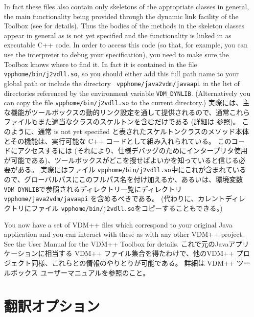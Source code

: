 \documentclass[\pformat,12pt]{jarticle}
\newcommand{\vdmhome}{vpphome}
\begin{document}
In fact these files also contain only skeletons of the appropriate
classes in general, the main functionality being provided through the
dynamic link facility of the Toolbox (see \cite{DLMan-SCSK} for
details). Thus the bodies of the methods in the skeleton classes
appear in general as \textsf{is not yet specified} and the
functionality is linked in as executable C++ code. In order to access
this code (so that, for example, you can use the interpreter to debug
your specification), you need to make sure the Toolbox knows where to
find it. In fact it is contained in the file {\tt
  \vdmhome/bin/j2vdll.so}, so you should either add this full 
path name to your global path or include the directory {\tt
  \vdmhome/java2vdm/javaapi} in the list of directories referenced by the
environment variable {\tt VDM\_DYNLIB}. (Alternatively you can copy
the file {\tt \vdmhome/bin/j2vdll.so} to the current directory.)
実際には、主な機能がツールボックスの動的リンク設定を通して提供されるので、通常これらファイルもまた適当なクラスのスケルトンを含むだけである (詳細は\cite{DLMan-SCSK} 参照)。 
このように、通常 \textsf{is not yet specified} と表されたスケルトンクラスのメソッド本体とその機能は、実行可能な C++ コードとして組み入れられている。
このコードにアクセスするには (それにより、仕様デバッグのためにインタープリタ使用が可能である)、ツールボックスがどこを捜せばよいかを知っていると信じる必要がある。 
実際にはファイル {\tt  \vdmhome/bin/j2vdll.so}中にこれが含まれているので、グローバルパスにこのフルパス名を付け加えるか、あるいは、環境変数 {\tt VDM\_DYNLIB}で参照されるディレクトリ一覧にディレクトリ {\tt  \vdmhome/java2vdm/javaapi} を含めるべきである。
(代わりに、カレントディレクトリにファイル {\tt \vdmhome/bin/j2vdll.so}をコピーすることもできる。)

You now have a set of VDM++ files which correspond to your original
Java application and you can interact with these as with any other
VDM++ project. See the User Manual for the VDM++ Toolbox
\cite{UserManPP-SCSK} for details.
これで元のJavaアプリケーションに相当する VDM++ ファイル集合を得たわけで、他のVDM++ プロジェクト同様、これらとの情報のやりとりが可能である。
詳細は VDM++ ツールボックス\cite{UserManPP-SCSK} ユーザーマニュアルを参照のこと。

\section{翻訳オプション}
\end{document}
